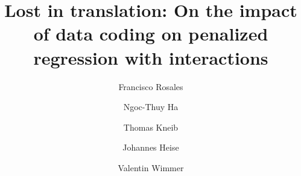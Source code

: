 \documentclass{bmcart}
\newcommand{\0}{\mathbf{0}}
\begin{document}
\begin{frontmatter}

\begin{fmbox}


\title{Lost in translation: On the impact of data coding on penalized regression with interactions}


\author[
   addressref={aff2},                   %
]{ }
\author[
addressref={aff6},
   email={lf.rosalesm@up.edu.pe}   %
]{Francisco Rosales} 
\author[
addressref={aff1},
]{Ngoc-Thuy Ha}
\author[
   addressref={aff4},
]{Thomas Kneib}
\author[
addressref={aff5},
]{Johannes Heise}
\author[
addressref={aff2}
]{Valentin Wimmer}





\address[id=aff2]{%
	,
	,
}


\address[id=aff6]{%
	,
	,
}

\address[id=aff1]{%
	, %
}


\end{fmbox}
\end{frontmatter}
\end{document}
